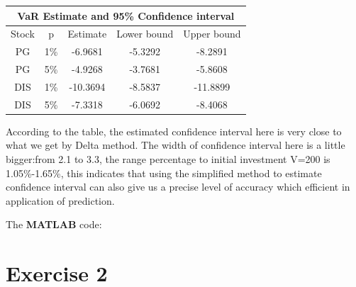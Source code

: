 \documentclass[12pt,letterpaper]{article}
\begin{document}
\begin{enumerate}[label=\textbf{(\Alph*)}]
\begin{enumerate}[label=(\roman*)]
\begin{table}[ht]
\centering %
\begin{tabular}{ccccc} %
\hline\hline %
\multicolumn{5}{c}{VaR Estimate and 95\% Confidence interval}\\
\hline Stock & p & Estimate & Lower bound & Upper bound\\
\hline %
PG & 1\% & -6.9681 & -5.3292 & -8.2891 \\ %
PG & 5\% & -4.9268 & -3.7681 & -5.8608 \\ %
DIS & 1\% & -10.3694 & -8.5837 & -11.8899 \\ %
DIS & 5\% &-7.3318 & -6.0692 & -8.4068\\
\hline %
\end{tabular}
\end{table}

According to the table, the estimated confidence interval here is very close to what we get by Delta method. The width of confidence interval here is a little bigger:from 2.1 to 3.3, the range percentage to initial investment V=200 is 1.05\%-1.65\%, this indicates that using the simplified method to estimate confidence interval can also give us a precise level of accuracy which efficient in application of prediction. \\
\end{enumerate}

The \textbf{MATLAB} code:
   
\newpage


\end{enumerate}


\section*{Exercise 2}
  
\end{document}
